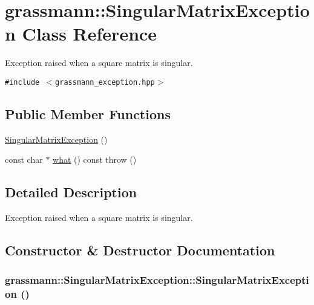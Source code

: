 \hypertarget{classgrassmann_1_1SingularMatrixException}{
\section{grassmann::SingularMatrixException Class Reference}
\label{classgrassmann_1_1SingularMatrixException}
}
Exception raised when a square matrix is singular.  


{\tt \#include $<$grassmann\_\-exception.hpp$>$}

\subsection*{Public Member Functions}
\begin{CompactItemize}
\item 
\hyperlink{classgrassmann_1_1SingularMatrixException_26ba77e872ef3c178f2bdb4cdeab767e}{SingularMatrixException} ()
\item 
const char $\ast$ \hyperlink{classgrassmann_1_1SingularMatrixException_c23401f8fafc59228076764730cdac52}{what} () const   throw ()
\end{CompactItemize}


\subsection{Detailed Description}
Exception raised when a square matrix is singular. 

\subsection{Constructor \& Destructor Documentation}
\hypertarget{classgrassmann_1_1SingularMatrixException_26ba77e872ef3c178f2bdb4cdeab767e}{
\subsubsection[SingularMatrixException]{\setlength{\rightskip}{0pt plus 5cm}grassmann::SingularMatrixException::SingularMatrixException ()}}
\label{classgrassmann_1_1SingularMatrixException_26ba77e872ef3c178f2bdb4cdeab767e}




